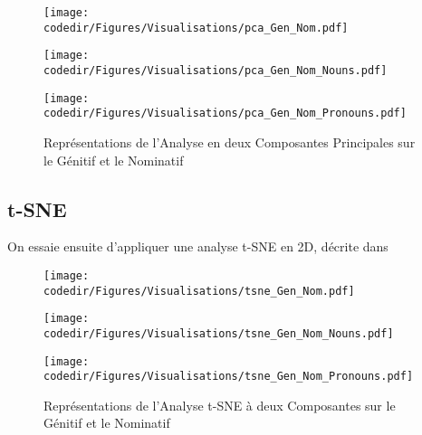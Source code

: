 \documentclass{cours}
\newcommand{\codedir}{Morphosyntactic-Categories_Code}
\begin{document}
\begin{figure}[H]
    \begin{center}
        \begin{minipage}{.45\textwidth}
            \begin{center}
                \texttt{[image: \\codedir/Figures/Visualisations/pca\_Gen\_Nom.pdf]}
            \end{center}
        \end{minipage}
    \end{center}
    \begin{minipage}{.45\textwidth}
        \begin{center}
            \texttt{[image: \\codedir/Figures/Visualisations/pca\_Gen\_Nom\_Nouns.pdf]}
        \end{center}
    \end{minipage}
    \begin{minipage}{.45\textwidth}
        \begin{center}
            \texttt{[image: \\codedir/Figures/Visualisations/pca\_Gen\_Nom\_Pronouns.pdf]}
        \end{center}
    \end{minipage}
    \caption{Représentations de l'Analyse en deux Composantes Principales sur le Génitif et le Nominatif}
\end{figure}


\subsection{t-SNE}
On essaie ensuite d'appliquer une analyse t-SNE en 2D, décrite dans \cite{Maa08}
\begin{figure}[H]
    \begin{center}
        \begin{minipage}{.45\textwidth}
            \begin{center}
                \texttt{[image: \\codedir/Figures/Visualisations/tsne\_Gen\_Nom.pdf]}
            \end{center}
        \end{minipage}
    \end{center}
    
    \begin{minipage}{.5\textwidth}
        \begin{center}
            \texttt{[image: \\codedir/Figures/Visualisations/tsne\_Gen\_Nom\_Nouns.pdf]}
        \end{center}
    \end{minipage}
    \begin{minipage}{.q5\textwidth}
        \begin{center}
            \texttt{[image: \\codedir/Figures/Visualisations/tsne\_Gen\_Nom\_Pronouns.pdf]}
        \end{center}
    \end{minipage}
    \caption{Représentations de l'Analyse t-SNE à deux Composantes sur le Génitif et le Nominatif}
\end{figure}

\appendix



\end{document}
